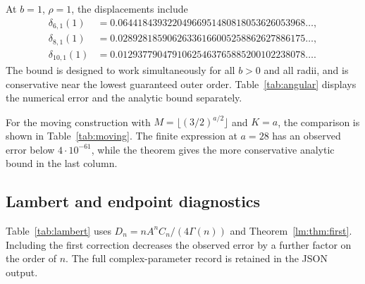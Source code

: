At $b=1$, $\rho=1$, the displacements include
\begin{align*}
 \delta_{6,1}(1)&=0.06441843932204966951480818053626053968\ldots,\\
 \delta_{8,1}(1)&=0.02892818590626336166005258862627886175\ldots,\\
 \delta_{10,1}(1)&=0.01293779047910625463765885200102238078\ldots.
\end{align*}
The bound is designed to work simultaneously for all $b>0$ and
all radii, and is conservative near the lowest guaranteed outer
order. Table~\ref{tab:angular} displays the numerical error and
the analytic bound separately.

\begin{table}[htbp]
\centering
\caption{Degree reconstruction at $b=1$, $\rho=1$. Errors are
85-digit numerical diagnostics; bounds evaluate
\eqref{ang:eq:sum-error}.}
\label{tab:angular}

\end{table}

For the moving construction with
$M=\lfloor(3/2)^{a/2}\rfloor$ and $K=a$, the comparison is
shown in Table~\ref{tab:moving}. The finite expression at $a=28$
has an observed error below $4\cdot10^{-61}$, while the theorem
gives the more conservative analytic bound in the last column.

\begin{table}[htbp]
\centering
\caption{Finite frequency-and-degree approximations at $b=1$,
$\rho=1$. Bounds evaluate \eqref{ang:eq:finite-error}.}
\label{tab:moving}

\end{table}

\subsection{Lambert and endpoint diagnostics}

Table~\ref{tab:lambert} uses $D_n=nA^nC_n/(4\Gamma(n))$ and
Theorem~\ref{lm:thm:first}. Including the first correction
decreases the observed error by a further factor on the order of
$n$. The full complex-parameter record is retained in the JSON output.

\begin{table}[htbp]
\centering
\caption{Lambert coefficient diagnostics at $u=0.1$. The errors
compare the full finite formula with the leading term, and with
the leading term plus the first correction.}
\label{tab:lambert}

\end{table}

